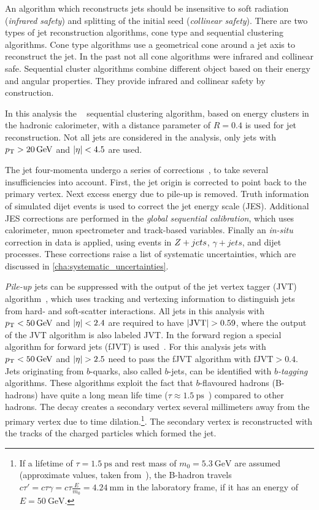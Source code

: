 An algorithm which reconstructs jets should be insensitive to soft radiation (\emph{infrared safety})
and splitting of the initial seed (\emph{collinear safety}).
There are two types of jet reconstruction algorithms, cone type and sequential clustering algorithms.
Cone type algorithms use a geometrical cone around a jet axis to reconstruct the jet. In the past not
all cone algorithms were infrared and collinear safe.
Sequential cluster algorithms combine different object based on their energy and angular properties.
They provide infrared and collinear safety by construction.

In this analysis the \antikt{}~\cite{Cacciari:2008gp,Cacciari:2005hq} sequential clustering algorithm, based on energy clusters in the
hadronic calorimeter, with a distance parameter of $R = 0.4$ is used for jet reconstruction.
Not all jets are considered in the analysis, only jets with $\pt > \SI{20}{\GeV}$ and $\left|\eta\right| < 4.5$ are used.

The jet four-momenta undergo a series of corrections~\cite{PERF-2016-04}, to take several insufficiencies into account.
First, the jet origin is corrected to point back to the primary vertex. Next excess energy due to pile-up is removed.
Truth information of simulated dijet events is used to correct the jet energy scale (JES).
Additional JES corrections are performed in the \emph{global sequential calibration}, which uses calorimeter, muon
spectrometer and track-based variables. Finally an \emph{in-situ} correction in data is applied, using events
in $Z+jets$, $\gamma + jets$, and dijet processes.
These corrections raise a list of systematic uncertainties, which are discussed in \cref{cha:systematic_uncertainties}.

\emph{Pile-up} jets can be suppressed with the output of the jet vertex tagger (JVT) algorithm~\cite{PERF-2014-03}, which
uses tracking and vertexing information to distinguish jets from hard- and soft-scatter interactions.
All jets in this analysis with $\pt < \SI{50}{\GeV}$ and $\left|\eta\right| < 2.4$ are required to have $\left|\text{JVT}\right| > 0.59$, where the output of the
JVT algorithm is also labeled JVT\@.
In the forward region a special algorithm for forward jets (fJVT) is used~\cite{ATL-PHYS-PUB-2015-034}.
For this analysis jets with $\pt < \SI{50}{\GeV}$ and $\left|\eta\right| > 2.5$ need to pass the fJVT algorithm with
$\text{fJVT} > 0.4$.
\\[\baselineskip]
Jets originating from $b$-quarks, also called $b$-jets, can be identified with \emph{$b$-tagging} algorithms.
These algorithms exploit the fact that $b$-flavoured hadrons (B-hadrons) have quite a long mean life time
($\tau \approx \SI{1.5}{\ps}$~\cite{PDG}) compared to other hadrons.
The decay creates a secondary vertex several millimeters away from the primary vertex due to time
dilation.\footnote{If a lifetime of $\tau = \SI{1.5}{\ps}$ and rest mass of $m_0 = \SI{5.3}{\GeV}$ are assumed (approximate values, taken from~\cite{PDG}),
the B-hadron travels $c\tau' = c \tau \gamma = c \tau \frac{E}{m_0} = \SI{4.24}{\mm}$ in the laboratory frame, if it has an energy of $E = \SI{50}{\GeV}$.}.
The secondary vertex is reconstructed with the tracks of the charged particles which formed the jet.


